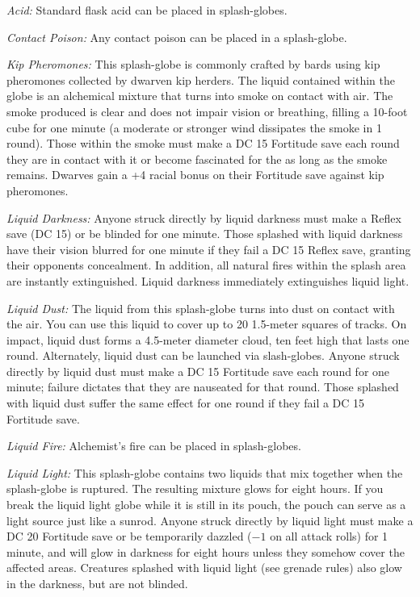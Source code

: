  \textit{Acid:} Standard flask acid can be placed in splash-globes.

 \textit{Contact Poison:} Any contact poison can be placed in a splash-globe.

 \textit{Kip Pheromones:} This splash-globe is commonly crafted by bards using kip pheromones collected by dwarven kip herders. The liquid contained within the globe is an alchemical mixture that turns into smoke on contact with air. The smoke produced is clear and does not impair vision or breathing, filling a 10-foot cube for one minute (a moderate or stronger wind dissipates the smoke in 1 round). Those within the smoke must make a DC 15 Fortitude save each round they are in contact with it or become fascinated for the as long as the smoke remains. Dwarves gain a +4 racial bonus on their Fortitude save against kip pheromones.

 \textit{Liquid Darkness:} Anyone struck directly by liquid darkness must make a Reflex save (DC 15) or be blinded for one minute. Those splashed with liquid darkness have their vision blurred for one minute if they fail a DC 15 Reflex save, granting their opponents concealment. In addition, all natural fires within the splash area are instantly extinguished. Liquid darkness immediately extinguishes liquid light.

 \textit{Liquid Dust:} The liquid from this splash-globe turns into dust on contact with the air. You can use this liquid to cover up to 20 1.5-meter squares of tracks. On impact, liquid dust forms a 4.5-meter diameter cloud, ten feet high that lasts one round. Alternately, liquid dust can be launched via slash-globes. Anyone struck directly by liquid dust must make a DC 15 Fortitude save each round for one minute; failure dictates that they are nauseated for that round. Those splashed with liquid dust suffer the same effect for one round if they fail a DC 15 Fortitude save.

 \textit{Liquid Fire:} Alchemist's fire can be placed in splash-globes.

 \textit{Liquid Light:} This splash-globe contains two liquids that mix together when the splash-globe is ruptured. The resulting mixture glows for eight hours. If you break the liquid light globe while it is still in its pouch, the pouch can serve as a light source just like a sunrod. Anyone struck directly by liquid light must make a DC 20 Fortitude save or be temporarily dazzled ($-1$ on all attack rolls) for 1 minute, and will glow in darkness for eight hours unless they somehow cover the affected areas. Creatures splashed with liquid light (see grenade rules) also glow in the darkness, but are not blinded.

